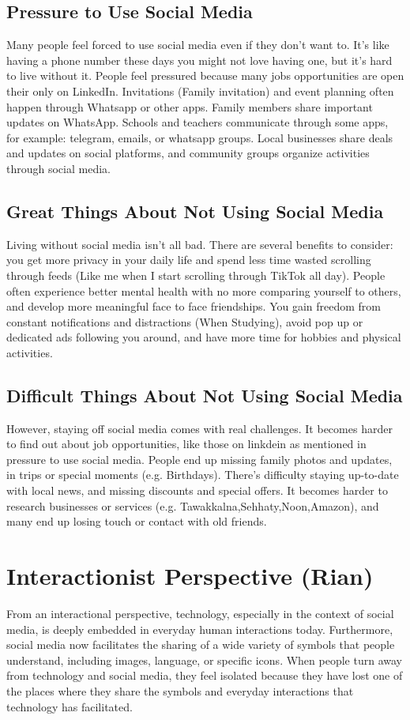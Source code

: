 \documentclass{article}
\begin{document}
\subsection{Pressure to Use Social Media}
Many people feel forced to use social media even if they don't want to. It's like having a phone number these days you might not love having one, but it's hard to live without it. People feel pressured because many jobs opportunities are open their only on LinkedIn. Invitations (Family invitation) and event planning often happen through Whatsapp or other apps. Family members share important updates on WhatsApp. Schools and teachers communicate through some apps, for example: telegram, emails, or whatsapp groups. Local businesses share deals and updates on social platforms, and community groups organize activities through social media.

\subsection{Great Things About Not Using Social Media}
Living without social media isn't all bad. There are several benefits to consider: you get more privacy in your daily life and spend less time wasted scrolling through feeds (Like me when I start scrolling through TikTok all day). People often experience better mental health with no more comparing yourself to others, and develop more meaningful face to face friendships. You gain freedom from constant notifications and distractions (When Studying), avoid pop up or dedicated ads following you around, and have more time for hobbies and physical activities.

\subsection{Difficult Things About Not Using Social Media}
However, staying off social media comes with real challenges. It becomes harder to find out about job opportunities, like those on linkdein as mentioned in pressure to use social media. People end up missing family photos and updates, in trips or special moments (e.g. Birthdays). There's difficulty staying up-to-date with local news, and missing discounts and special offers. It becomes harder to research businesses or services (e.g. Tawakkalna,Sehhaty,Noon,Amazon), and many end up losing touch or contact with old friends.

\newpage
\section{Interactionist Perspective (Rian)}
From an interactional perspective, technology, especially in the context of social media, is deeply embedded in everyday human interactions today. Furthermore, social media now facilitates the sharing of a wide variety of symbols that people understand, including images, language, or specific icons. When people turn away from technology and social media, they feel isolated because they have lost one of the places where they share the symbols and everyday interactions that technology has facilitated.
\end{document}
